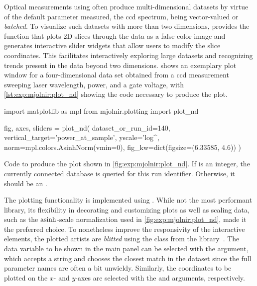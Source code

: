 Optical measurements using \mjolnir often produce multi-dimensional datasets by virtue of the default parameter measured, the \gls{ccd} spectrum, being vector-valued or \emph{batched}.
To visualize such datasets with more than two dimensions, \mjolnir provides the  function that plots 2D slices through the data as a false-color image and generates interactive slider widgets that allow users to modify the slice coordinates.
This facilitates interactively exploring large datasets and recognizing trends present in the data beyond two dimensions.
 shows an exemplary plot window for a four-dimensional data set obtained from a \gls{ccd} measurement sweeping laser wavelength, power, and a gate voltage, with \cref{lst:exp:mjolnir:plot_nd} showing the code necessary to produce the plot.

\begin{listing}
    \begin{py}
        import matplotlib as mpl
        from mjolnir.plotting import plot_nd

        fig, axes, sliders = plot_nd(
            dataset_or_run_id=140, vertical_target='power_at_sample',
            yscale='log^\prime, norm=mpl.colors.AsinhNorm(vmin=0),
            fig_kw=dict(figsize=(6.33585, 4.6))
        )
    \end{py}
    \caption[\texttt{plot_nd()} example]{
        Code to produce the plot shown in \cref{fig:exp:mjolnir:plot_nd}.
        If  is an integer, the currently connected \qcodes database is queried for this run identifier.
        Otherwise, it should be an \xarray {}.
    }
    \label{lst:exp:mjolnir:plot_nd}
\end{listing}

The plotting functionality is implemented using \matplotlib.
While not the most performant library, its flexibility in decorating and customizing plots as well as scaling data, such as the $\operatorname{asinh}$-scale normalization used in \cref{fig:exp:mjolnir:plot_nd}, made it the preferred choice.
To nonetheless improve the responsivity of the interactive elements, the plotted artists are \emph{blitted}
using the  class from the \qutil library~\cite{Hangleiter_qutil}.
The data variable to be shown in the main panel can be selected with the  argument, which accepts a string and chooses the closest match in the dataset since the full parameter names are often a bit unwieldy.
Similarly, the coordinates to be plotted on the $x$- and $y$-axes are selected with the  and  arguments, respectively.

